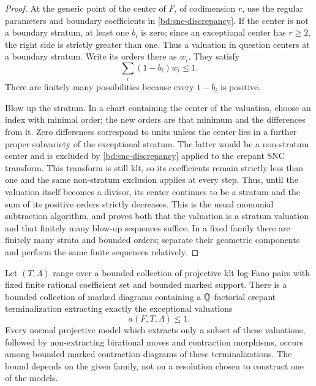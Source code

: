\begin{proof}
At the generic point of the center of $F$, of codimension $r$, use the regular parameters
and boundary coefficients in \eqref{bd:snc-discrepancy}.
If the center is not
a boundary stratum, at least one $b_i$ is zero; since an
exceptional center has $r\geq2$, the right side is strictly
greater than one.  Thus a valuation in question centers at a
boundary stratum.  Write its orders there as $w_i$.  They satisfy
\[
                     \sum_i(1-b_i)w_i\leq1.
\]
There are finitely many possibilities because every $1-b_i$ is
positive.

Blow up the stratum.  In a chart containing the center of the
valuation, choose an index with minimal order; the new orders
are that minimum and the differences from it.  Zero differences
correspond to units unless the center lies in a further proper
subvariety of the exceptional stratum.  The latter would be a
non-stratum center and is excluded by
\eqref{bd:snc-discrepancy} applied to the crepant SNC transform.
This transform is still klt, so its coefficients remain strictly less
than one and the same non-stratum exclusion applies at every step.
Thus, until the valuation itself becomes a divisor, its center
continues to be a stratum and the sum of its positive orders
strictly decreases.  This is the usual monomial subtraction
algorithm, and proves both that the valuation is a stratum
valuation and that finitely many blow-up sequences suffice.
In a fixed family there are finitely many strata and bounded
orders; separate their geometric components and perform the
same finite sequences relatively.
\end{proof}

\begin{theorem}
\label{bd:terminalization}
Let $(T,\Lambda)$ range over a bounded collection of projective
klt log-Fano pairs with fixed finite rational coefficient set and
bounded marked support.  There is a bounded collection of marked
diagrams containing a $\mathbb Q$-factorial crepant terminalization
extracting exactly the exceptional valuations
\[
                         a(F,T,\Lambda)\leq1.
\]
Every normal projective model which extracts only a subset of
these valuations, followed by non-extracting birational moves
and contraction morphisms, occurs among bounded marked
contraction diagrams of these terminalizations.  The bound
depends on the given family, not on a resolution chosen to
construct one of the models.
\end{theorem}

